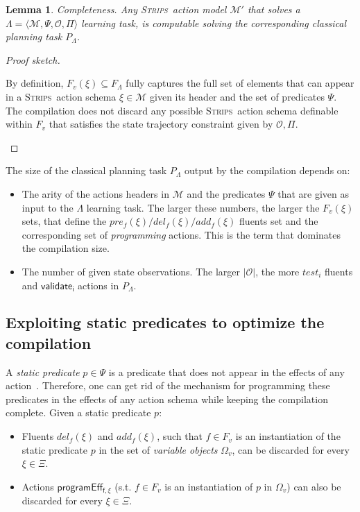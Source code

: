 \documentclass[3p,times]{elsarticle}
\newtheorem{mylemma}[mytheorem]{Lemma}
\newcommand{\strips}{\textsc{Strips}}     %
\newcommand{\tup}[1]{{\langle #1 \rangle}}
\begin{document}
\begin{mylemma}
Completeness. Any \strips\ action model $\mathcal{M}'$ that solves a $\Lambda=\tup{\mathcal{M},\Psi,\mathcal{O},\Pi}$ learning task, is computable solving the corresponding classical planning task $P_{\Lambda}$.
\end{mylemma}

\begin{proof}[Proof sketch]
\begin{small}
By definition, $F_v(\xi)\subseteq F_\Lambda$ fully captures the full set of elements that can appear in a \strips\ action schema $\xi\in\mathcal{M}$ given its header and the set of predicates $\Psi$. The compilation does not discard any possible \strips\ action schema definable within $F_v$ that satisfies the state trajectory constraint given by $\mathcal{O},\Pi$.
\end{small}
\end{proof}

The size of the classical planning task $P_{\Lambda}$ output by the compilation depends on:
\begin{itemize}
\item The arity of the actions headers in $\mathcal{M}$ and the predicates $\Psi$ that are given as input to the $\Lambda$ learning task. The larger these numbers, the larger the $F_v(\xi)$ sets, that define the $pre_f(\xi)/del_f(\xi)/add_f(\xi)$ fluents set and the corresponding set of {\em programming} actions. This is the term that dominates the compilation size.
\item The number of given state observations. The larger $|\mathcal{O}|$, the more $test_i$ fluents and $\mathsf{validate_{i}}$ actions in $P_{\Lambda}$.
\end{itemize}


\subsection{Exploiting static predicates to optimize the compilation}
A {\em static predicate} $p \in \Psi$ is a predicate that does not appear in the effects of any action~\cite{fox:TIM:JAIR1998}. Therefore, one can get rid of the mechanism for programming these predicates in the effects of any action schema while keeping the compilation complete. Given a static predicate $p$:
\begin{itemize}
\item Fluents $del_f(\xi)$ and $add_f(\xi)$, such that $f\in F_v$ is an instantiation of the static predicate $p$ in the set of {\em variable objects} $\Omega_v$, can be discarded for every $\xi\in\Xi$.
\item Actions $\mathsf{programEff_{f,\xi}}$ (s.t. $f\in F_v$ is an instantiation of $p$ in $\Omega_v$) can also be discarded for every $\xi\in\Xi$.
\end{itemize}
\end{document}
